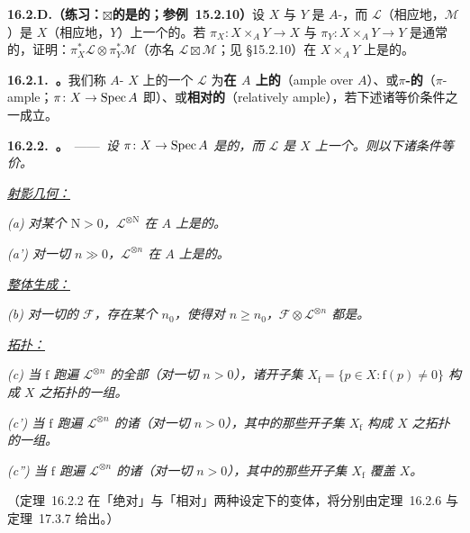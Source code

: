 \textbf{16.2.D.（练习：\trVeryAmple{}$\boxtimes$\trVeryAmple{}的是\trVeryAmple{}的；参\mbox{例~15.2.10}）}\quad 设 $X$ 与 $Y$ 是\trProper{} $A$-\trScheme，而 $\mathscr{L}$（相应地，$\mathscr{M}$）是 $X$（相应地，$Y$）上一个\trVeryAmple{}的\trInvertibleSheaf。若 $\pi_X\colon X\times_A Y\to X$ 与 $\pi_Y\colon X\times_A Y\to Y$ 是通常的\trProjection，证明：$\pi_X^*\mathscr{L}\otimes\pi_Y^*\mathscr{M}$（亦名 $\mathscr{L}\boxtimes\mathscr{M}$；见 \S15.2.10）在 $X\times_A Y$ 上是\trVeryAmple{}的。

\textbf{16.2.1.\ \trhDefinition{}。}\quad 我们称\trProper{} $A$-\trScheme{} $X$ 上的一个\trInvertibleSheaf{} $\mathscr{L}$ 为\textbf{在 $A$ 上\trAmple{}的}（ample over $A$）、或\textbf{$\pi$-\trAmple{}的}（$\pi$-ample；$\pi\colon X\to\operatorname{Spec} A$ 即\trStructureMorphism）、或\textbf{相对\trAmple{}的}（relatively ample），若下述诸等价条件之一成立。

\textbf{16.2.2.\ \trhTheorem{}。}\ ——\ \emph{设 $\pi\colon X\to\operatorname{Spec} A$ 是\trProper{}的，而 $\mathscr{L}$ 是 $X$ 上一个\trInvertibleSheaf。则以下诸条件等价。}

\underline{\emph{射影几何：}}

\emph{(a) 对某个 $\mathrm{N}>0$，$\mathscr{L}^{\otimes\mathrm{N}}$ 在 $A$ 上是\trVeryAmple{}的。}

\emph{(a') 对一切 $n\gg 0$，$\mathscr{L}^{\otimes n}$ 在 $A$ 上是\trVeryAmple{}的。}

\underline{\emph{整体生成：}}

\emph{(b) 对一切\trFiniteType{}的\trQCSheaf{} $\mathscr{F}$，存在某个 $n_0$，使得对 $n\ge n_0$，$\mathscr{F}\otimes\mathscr{L}^{\otimes n}$ 都是\trGloballyGenerated。}

\underline{\emph{拓扑：}}

\emph{(c) 当 $\mathrm{f}$ 跑遍 $\mathscr{L}^{\otimes n}$ 的全部\trGlobalSections（对一切 $n>0$），诸开子集 $X_{\mathrm{f}}=\{p\in X:\mathrm{f}(p)\neq 0\}$ 构成 $X$ 之拓扑的一组\trBase。}

\emph{(c') 当 $\mathrm{f}$ 跑遍 $\mathscr{L}^{\otimes n}$ 的诸\trGlobalSections（对一切 $n>0$），其中\trAffine{}的那些开子集 $X_{\mathrm{f}}$ 构成 $X$ 之拓扑的一组\trBase。}

\emph{(c'') 当 $\mathrm{f}$ 跑遍 $\mathscr{L}^{\otimes n}$ 的诸\trGlobalSections（对一切 $n>0$），其中\trAffine{}的那些开子集 $X_{\mathrm{f}}$ 覆盖 $X$。}

（\mbox{定理~16.2.2} 在「绝对」与「相对」两种设定下的变体，将分别由\mbox{定理~16.2.6} 与\mbox{定理~17.3.7} 给出。）

